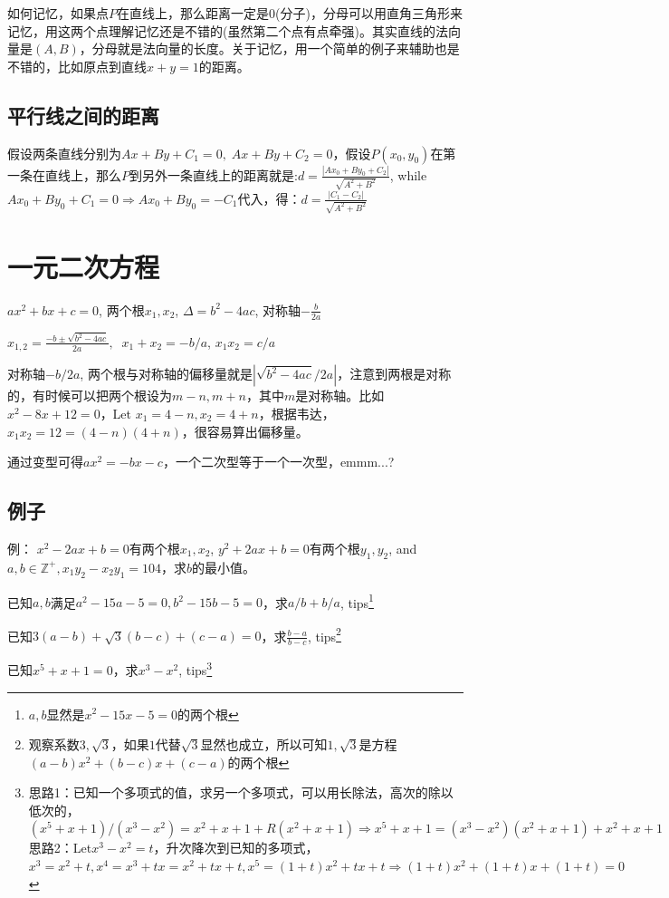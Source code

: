 \documentclass[../main.tex]{subfiles}
\begin{document}
如何记忆，如果点$P$在直线上，那么距离一定是$0$(分子)，分母可以用直角三角形来记忆，用这两个点理解记忆还是不错的(虽然第二个点有点牵强)。其实直线的法向量是$(A,B)$，分母就是法向量的长度。关于记忆，用一个简单的例子来辅助也是不错的，比如原点到直线$x+y=1$的距离。

\subsection{平行线之间的距离}
假设两条直线分别为$Ax+By+C_1=0, \; Ax+By+C_2=0$，假设$P(x_0,y_0)$在第一条在直线上，那么$P$到另外一条直线上的距离就是:$ d=\frac{|Ax_0+By_0+C_2|}{\sqrt{A^2+B^2}}$,
while $Ax_0+By_0+C_1=0 \Rightarrow Ax_0+By_0=-C_1$代入，得：$\displaystyle d=\frac{|C_1-C_2|}{\sqrt{A^2+B^2}}$

\clearpage
\section{一元二次方程}

$ax^2+bx+c=0$, 两个根$x_1, x_2$, $\Delta = b^2-4ac$, 对称轴$-\frac{b}{2a}$

$x_{1,2}=\frac{-b\pm \sqrt{b^{2}-4ac}}{2a}, \;\;x_1+x_2=-b/a$, \; $x_1x_2=c/a$

对称轴$-b/2a$, 两个根与对称轴的偏移量就是$|\sqrt{b^2-4ac}/2a|$，注意到两根是对称的，有时候可以把两个根设为$m-n, m+n$，其中$m$是对称轴。比如$x^2-8x+12=0$，Let $x_1=4-n, x_2=4+n$，根据韦达，
$x_1x_2=12=(4-n)(4+n)$，很容易算出偏移量。

通过变型可得$ax^2=-bx-c$，一个二次型等于一个一次型，emmm...?

\subsection{例子}
例： $x^2-2ax+b=0$有两个根$x_1, x_2$, $y^2+2ax+b=0$有两个根$y_1, y_2$, and $a, b \in \mathbb{Z}^+, x_1y_2-x_2y_1=104$，求$b$的最小值。

已知$a,b$满足$a^2-15a-5=0, b^2-15b-5=0$，求$a/b+b/a$, tips\footnote{$a,b$显然是$x^2-15x-5=0$的两个根}

已知$3(a-b)+\sqrt{3}(b-c)+(c-a)=0$，求$\frac{b-a}{b-c}$, tips\footnote{观察系数$3, \sqrt{3}$，如果$1$代替$\sqrt{3}$显然也成立，所以可知$1, \sqrt{3}$是方程$(a-b)x^2+(b-c)x+(c-a)$的两个根}

已知$x^5+x+1=0$，求$x^3-x^2$, tips\footnote{思路1：已知一个多项式的值，求另一个多项式，可以用长除法，高次的除以低次的，$(x^5+x+1)/(x^3-x^2)=x^2+x+1+R(x^2+x+1) \Rightarrow x^5+x+1=(x^3-x^2)(x^2+x+1)+x^2+x+1$\\
  思路2：Let$x^3-x^2=t$，升次降次到已知的多项式，$x^3=x^2+t, x^4=x^3+tx=x^2+tx+t, x^5=(1+t)x^2+tx+t \Rightarrow (1+t)x^2+(1+t)x+(1+t)=0$
}
\clearpage
\end{document}
